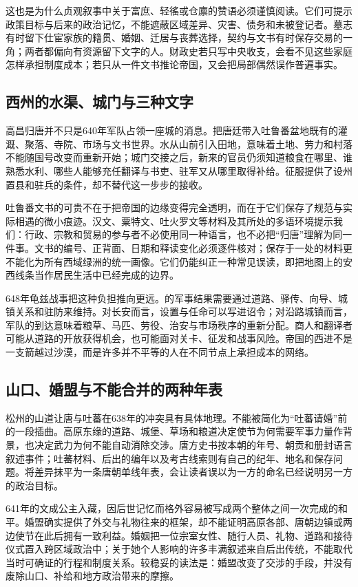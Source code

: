 这也是为什么贞观叙事中关于富庶、轻徭或仓廪的赞语必须谨慎阅读。它们可提示政策目标与后来的政治记忆，不能遮蔽区域差异、灾害、债务和未被登记者。墓志有时留下仕宦家族的籍贯、婚姻、迁居与丧葬选择，契约与文书有时保存交易的一角；两者都偏向有资源留下文字的人。财政史若只写中央收支，会看不见这些家庭怎样承担制度成本；若只从一件文书推论帝国，又会把局部偶然误作普遍事实。

\subsection{西州的水渠、城门与三种文字}
高昌归唐并不只是640年军队占领一座城的消息。把唐廷带入吐鲁番盆地既有的灌溉、聚落、寺院、市场与文书世界。水从山前引入田地，意味着土地、劳力和村落不能随国号改变而重新开始；城门交接之后，新来的官员仍须知道粮食在哪里、谁熟悉水利、哪些人能够充任翻译与书吏、驻军又从哪里取得补给。征服提供了设州置县和驻兵的条件，却不替代这一步步的接收。

吐鲁番文书的可贵不在于把帝国的边缘变得完全透明，而在于它们保存了规范与实际相遇的微小痕迹。汉文、粟特文、吐火罗文等材料及其所处的多语环境提示我们：行政、宗教和贸易的参与者不必使用同一种语言，也不必把“归唐”理解为同一件事。文书的编号、正背面、日期和释读变化必须逐件核对；保存于一处的材料更不能化为所有西域绿洲的统一画像。它们仍能纠正一种常见误读，即把地图上的安西线条当作居民生活中已经完成的边界。

648年龟兹战事把这种负担推向更远。的军事结果需要通过道路、驿传、向导、城镇关系和驻防来维持。对长安而言，设置与任命可以写进诏令；对沿路城镇而言，军队的到达意味着粮草、马匹、劳役、治安与市场秩序的重新分配。商人和翻译者可能从道路的开放获得机会，也可能面对关卡、征发和战事风险。帝国的西进不是一支箭越过沙漠，而是许多并不平等的人在不同节点上承担成本的网络。

\subsection{山口、婚盟与不能合并的两种年表}
松州的山道让唐与吐蕃在638年的冲突具有具体地理。不能被简化为“吐蕃请婚”前的一段插曲。高原东缘的道路、城堡、草场和粮道决定使节为何需要军事力量作背景，也决定武力为何不能自动消除交涉。唐方史书按本朝的年号、朝贡和册封语言叙述事件；吐蕃材料、后出的编年以及考古线索则有自己的纪年、地名和保存问题。将差异抹平为一条唐朝单线年表，会让读者误以为一方的命名已经说明另一方的政治目标。

641年的文成公主入藏，因后世记忆而格外容易被写成两个整体之间一次完成的和平。婚盟确实提供了外交与礼物往来的框架，却不能证明高原各部、唐朝边镇或两边使节在此后拥有一致利益。婚姻把一位宗室女性、随行人员、礼物、道路和接待仪式置入跨区域政治中；关于她个人影响的许多丰满叙述来自后出传统，不能取代当时可确证的行程和制度关系。较稳妥的读法是：婚盟改变了交涉的手段，并没有废除山口、补给和地方政治带来的摩擦。

